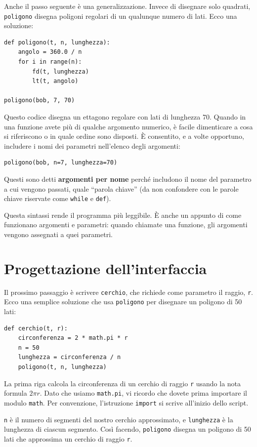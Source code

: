 \documentclass[10pt]{book}
\begin{document}
Anche il passo seguente è una generalizzazione. Invece di disegnare solo quadrati, {\tt poligono} disegna poligoni regolari di un qualunque numero di lati. Ecco una soluzione:

\begin{verbatim}
def poligono(t, n, lunghezza):
    angolo = 360.0 / n
    for i in range(n):
        fd(t, lunghezza)
        lt(t, angolo)

poligono(bob, 7, 70)
\end{verbatim}
%
Questo codice disegna un ettagono regolare con lati di lunghezza 70. Quando in una funzione avete più di qualche argomento numerico, è facile dimenticare a cosa si riferiscono o in quale ordine sono disposti. È consentito, e a volte opportuno, includere i nomi dei parametri nell'elenco degli argomenti:

\begin{verbatim}
poligono(bob, n=7, lunghezza=70)
\end{verbatim}
%
Questi sono detti {\bf argomenti per nome} perché includono il nome del parametro a cui vengono passati, quale ``parola chiave'' (da non confondere con le parole chiave riservate come {\tt while} e {\tt def}).

Questa sintassi rende il programma più leggibile. È anche un appunto di come funzionano argomenti e parametri: quando chiamate una funzione, gli argomenti vengono assegnati a quei parametri.


\section{Progettazione dell'interfaccia}

Il prossimo passaggio è scrivere {\tt cerchio}, che richiede come parametro il raggio, {\tt r}. Ecco una semplice soluzione che usa {\tt poligono} per disegnare un poligono di 50 lati:

\begin{verbatim}
def cerchio(t, r):
    circonferenza = 2 * math.pi * r
    n = 50
    lunghezza = circonferenza / n
    poligono(t, n, lunghezza)
\end{verbatim}
%
La prima riga calcola la circonferenza di un cerchio di raggio
{\tt r} usando la nota formula $2 \pi r$. Dato che usiamo {\tt math.pi}, vi ricordo che dovete prima importare il modulo {\tt math}.  Per convenzione, l'istruzione {\tt import} si scrive all'inizio dello script.

{\tt n} è il numero di segmenti del nostro cerchio approssimato, e {\tt lunghezza} è la lunghezza di ciascun segmento. Così facendo, {\tt poligono}
disegna un poligono di 50 lati che approssima un cerchio di raggio {\tt r}.
\end{document}
